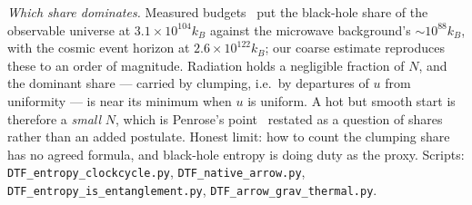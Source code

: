 \documentclass[11pt]{article}
\begin{document}
\emph{Which share dominates.} Measured budgets~\cite{EganLineweaver2010} put the black-hole share of the
observable universe at $3.1\times10^{104}k_B$ against the microwave background's $\sim\!10^{88}k_B$, with the
cosmic event horizon at $2.6\times10^{122}k_B$; our coarse estimate reproduces these to an order of magnitude.
Radiation holds a negligible fraction of $N$, and the dominant share --- carried by clumping, i.e.\ by
departures of $u$ from uniformity --- is near its minimum when $u$ is uniform. A hot but smooth start is
therefore a \emph{small} $N$, which is Penrose's point~\cite{Penrose1979} restated as a question of shares
rather than an added postulate. Honest limit: how to count the clumping share has no agreed formula, and
black-hole entropy is doing duty as the proxy.
Scripts: \texttt{DTF\_entropy\_clockcycle.py}, \texttt{DTF\_native\_arrow.py},
\texttt{DTF\_entropy\_is\_entanglement.py}, \texttt{DTF\_arrow\_grav\_thermal.py}.

\end{document}

